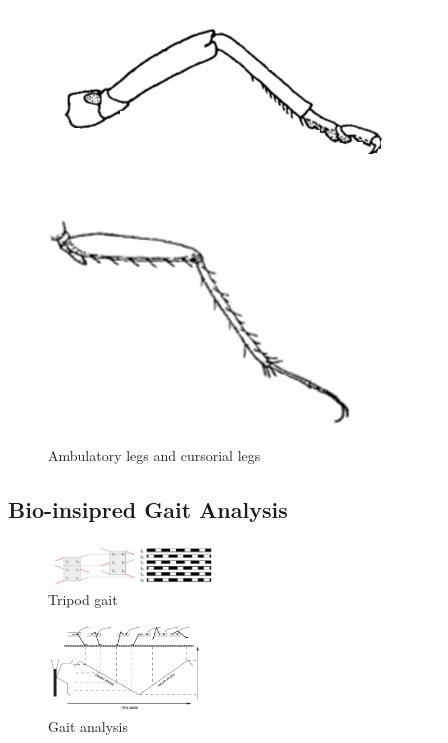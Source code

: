 \documentclass[conference]{IEEEtran}
\begin{document}
\begin{figure}
    \centering
    \includegraphics[scale=0.36,align=t]{leg1.png}
    \includegraphics[scale=0.35,align=t]{leg2.jpg}
    \caption{Ambulatory legs and cursorial legs}
    \label{fig9}
\end{figure}




\subsection{Bio-insipred Gait Analysis}\label{ss}
\begin{figure}
    \centerline{\includegraphics[width=0.4\textwidth]{tri.png}}
    \caption{Tripod gait}
    \label{fig6}
\end{figure}

\begin{figure}
    \centerline{\includegraphics[width=0.4\textwidth]{gait.png}}
    \caption{Gait analysis}
    \label{fig7}
\end{figure}
\end{document}

